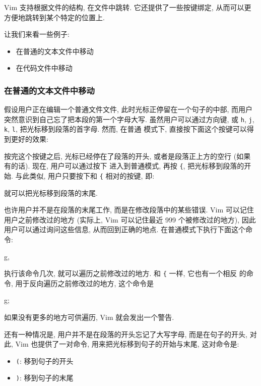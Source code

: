 Vim 支持根据文件的结构, 在文件中跳转. 它还提供了一些按键绑定, 从而可以更
方便地跳转到某个特定的位置上.

让我们来看一些例子:
\begin{itemize}
    \item 在普通的文本文件中移动
    \item 在代码文件中移动
\end{itemize}

\subsubsection{在普通的文本文件中移动}
\label{subsubsec:moving_around_within_a_text_file}

假设用户正在编辑一个普通文件文件, 此时光标正停留在一个句子的中部, 而用户
突然意识到自己忘了把本段的第一个字母大写. 虽然用户可以通过方向键, 或
\texttt{h}, \texttt{j}, \texttt{k}, \texttt{l}, 把光标移到段落的首字母. 然而, 在普通
模式下, 直接按下面这个按键可以得到更好的效果:
\begin{vimcode}
{
\end{vimcode}

按完这个按键之后, 光标已经停在了段落的开头, 或者是段落正上方的空行 (如果
有的话). 现在, 用户可以通过按下  进入到普通模式, 再按 \texttt{\{},
把光标移到段落的开始. 与此类似, 用户只要按下和 \texttt{\{} 相对的按键, 即:
\begin{vimcode}
}
\end{vimcode}
就可以把光标移到段落的末尾.

也许用户并不是在段落的末尾工作, 而是在修改段落中的某些错误. Vim 可以记住
用户之前修改过的地方 (实际上, Vim 可以记住最近 999 个被修改过的地方), 因此
用户可以通过询问这些信息, 从而回到正确的地点. 在普通模式下执行下面这个命令:
\begin{vimcode}
g,
\end{vimcode}
执行该命令几次, 就可以遍历之前修改过的地方. 和 \texttt{\{} 一样, 它也有一个相反
的命令, 用于反向遍历之前修改过的地方, 这个命令是
\begin{vimcode}
g;
\end{vimcode}
如果没有更多的地方可供遍历, Vim 就会发出一个警告.

还有一种情况是, 用户并不是在段落的开头忘记了大写字母, 而是在句子的开头, 对此,
Vim 也提供了一对命令, 用来把光标移到句子的开始与末尾, 这对命令是:
\begin{itemize}
    \item \texttt{(}: 移到句子的开头
    \item \texttt{)}: 移到句子的末尾
\end{itemize}

